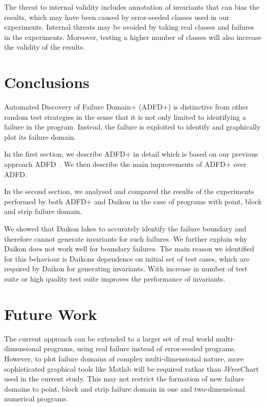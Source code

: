 The threat to internal validity includes annotation of invariants that can bias the results, which may have been caused by error-seeded classes used in our experiments. Internal threats may be avoided by taking real classes and failures in the experiments. Moreover, testing a higher number of classes will also increase the validity of the results.

\section{Conclusions}
Automated Discovery of Failure Domain+ (ADFD+) is distinctive from other random test strategies in the sense that it is not only limited to identifying a failure in the program. Instead, the failure is exploited to identify and graphically plot its failure domain.

In the first section, we describe ADFD+ in detail which is based on our previous approach ADFD~\cite{ahmad2013adfd}. We then describe the main improvements of ADFD+ over ADFD. 

In the second section, we analysed and compared the results of the experiments performed by both ADFD+ and Daikon in the case of programs with point, block and strip failure domain. 

We showed that Daikon lakes to accurately identify the failure boundary and therefore cannot generate invariants for such failures.  We further explain why Daikon does not work well for boundary failures. The main reason we identified for this behaviour is Daikons dependence on initial set of test cases, which are required by Daikon for generating invariants. With increase in number of test suite or high quality test suite improves the performance of invariants. 

\section{Future Work}\label{sec:intro6_15}
The current approach can be extended to a larger set of real world multi-dimensional programs, using real failure instead of error-seeded programs. However, to plot failure domains of complex multi-dimensional nature, more sophisticated graphical tools like Matlab will be required rathar than JFreeChart used in the current study. This may not restrict the formation of new failure domains to point, block and strip failure domain in one and two-dimensional numerical programs. 

